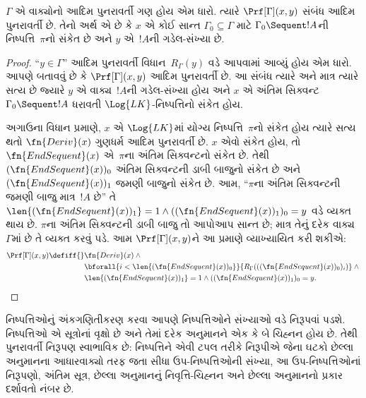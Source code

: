 \begin{prop}
$\Gamma$ એ વાક્યોનો આદિમ
પુનરાવર્તી ગણ હોય એમ ધારો. ત્યારે
$\Prf[\Gamma](x, y)$ સંબંધ આદિમ
પુનરાવર્તી છે. તેનો અર્થ એ છે કે
$x$ એ કોઈ સાન્ત
$\Gamma_0 \subseteq \Gamma$ માટે
$\Gamma_0 \Sequent !A$ની
નિષ્પત્તિ~$\pi$નો સંકેત છે અને
$y$ એ~$!A$ની ગડેલ-સંખ્યા છે.
\end{prop}

\begin{proof}
``$y \in \Gamma$'' આદિમ પુનરાવર્તી
વિધાન~$R_\Gamma(y)$ વડે આપવામાં
આવ્યું હોય એમ ધારો. આપણે બતાવવું છે
કે $\Prf[\Gamma](x, y)$ આદિમ
પુનરાવર્તી છે. આ સંબંધ ત્યારે અને
માત્ર ત્યારે સત્ય છે જ્યારે $y$ એ
વાક્ય~$!A$ની ગડેલ-સંખ્યા
હોય અને $x$ એ અંતિમ સિક્વન્ટ
$\Gamma_0 \Sequent !A$ ધરાવતી
$\Log{LK}$-નિષ્પત્તિનો સંકેત હોય.

અગાઉના વિધાન પ્રમાણે, $x$ એ
$\Log{LK}$માં યોગ્ય
નિષ્પત્તિ~$\pi$નો સંકેત હોય
ત્યારે સત્ય થતો
$\fn{Deriv}(x)$ ગુણધર્મ આદિમ
પુનરાવર્તી છે. $x$ એવો સંકેત હોય,
તો $\fn{EndSequent}(x)$ એ~$\pi$ના
અંતિમ સિક્વન્ટનો સંકેત છે. તેથી
$(\fn{EndSequent}(x))_0$ અંતિમ
સિક્વન્ટની ડાબી બાજુનો સંકેત છે
અને $(\fn{EndSequent}(x))_1$
જમણી બાજુનો સંકેત છે. આમ,
``$\pi$ના અંતિમ સિક્વન્ટની જમણી
બાજુ માત્ર~$!A$ છે'' તે
$\len{(\fn{EndSequent}(x))_1} = 1
\land ((\fn{EndSequent}(x))_1)_0 = y$
વડે વ્યક્ત થાય છે.
$\pi$ના અંતિમ સિક્વન્ટની ડાબી
બાજુ તો આપોઆપ સાન્ત છે; માત્ર
તેનું દરેક વાક્ય~$\Gamma$માં છે
તે વ્યક્ત કરવું પડે. આમ
$\Prf[\Gamma](x, y)$ને આ પ્રમાણે
વ્યાખ્યાયિત કરી શકીએ:
\begin{align*}
\Prf[\Gamma](x, y) \defiff {}&
\fn{Deriv}(x) \land {} \\
& \bforall{i <
  \len{(\fn{EndSequent}(x))_0}}{R_\Gamma(((\fn{EndSequent}(x))_0)_i)} \land {}\\
& \len{(\fn{EndSequent}(x))_1} = 1 \land ((\fn{EndSequent}(x))_1)_0 = y.
\end{align*}
\end{proof}
\endgroup


%
  \begingroup
\makeatletter{}\makeatother

\label{guunit:OLP-0287}


\begin{explain}
નિષ્પત્તિઓનું અંકગણિતીકરણ કરવા
આપણે નિષ્પત્તિઓને સંખ્યાઓ વડે
નિરૂપવાં પડશે. નિષ્પત્તિઓ એ
સૂત્રોનાં વૃક્ષો છે અને તેમાં
દરેક અનુમાનને એક કે બે ચિહ્નન હોય છે.
તેથી પુનરાવર્તી નિરૂપણ સ્વાભાવિક છે:
નિષ્પત્તિને એવી ટપલ તરીકે નિરૂપીએ
જેના ઘટકો છેલ્લા અનુમાનના આધારવાક્યો
તરફ જતા સીધા ઉપ-નિષ્પત્તિઓની સંખ્યા,
આ ઉપ-નિષ્પત્તિઓનાં નિરૂપણો,
અંતિમ સૂત્ર, છેલ્લા અનુમાનનું
નિવૃત્તિ-ચિહ્નન અને છેલ્લા અનુમાનનો
પ્રકાર દર્શાવતો નંબર છે.
\end{explain}

